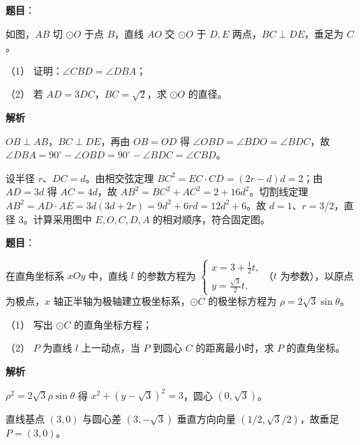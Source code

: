 \begin{answer}

\textbf{题目}：

如图，$AB$ 切 $\odot O$ 于点 $B$，直线 $AO$ 交 $\odot O$ 于 $D,E$ 两点，$BC\perp DE$，垂足为 $C$。

（1） 证明：$\angle CBD=\angle DBA$；

（2） 若 $AD=3DC$，$BC=\sqrt2$，求 $\odot O$ 的直径。
\nopagebreak[4]
\begin{center}\end{center}
\nopagebreak[4]
\textbf{解析}


$OB\perp AB$，$BC\perp DE$，再由 $OB=OD$ 得 $\angle OBD=\angle BDO=\angle BDC$，故 $\angle DBA=90^\circ-\angle OBD=90^\circ-\angle BDC=\angle CBD$。


设半径 $r$、$DC=d$。由相交弦定理 $BC^2=EC\cdot CD=(2r-d)d=2$；由 $AD=3d$ 得 $AC=4d$，故 $AB^2=BC^2+AC^2=2+16d^2$。切割线定理 $AB^2=AD\cdot AE=3d(3d+2r)=9d^2+6rd=12d^2+6$。故 $d=1$、$r=3/2$，直径 3。计算采用图中 $E,O,C,D,A$ 的相对顺序，符合固定图。



\end{answer}
\begin{answer}

\textbf{题目}：

在直角坐标系 $xOy$ 中，直线 $l$ 的参数方程为 $\begin{cases}x=3+\frac12t,\\y=\frac{\sqrt3}{2}t,\end{cases}$（$t$ 为参数），以原点为极点，$x$ 轴正半轴为极轴建立极坐标系，$\odot C$ 的极坐标方程为 $\rho=2\sqrt3\sin\theta$。

（1） 写出 $\odot C$ 的直角坐标方程；

（2） $P$ 为直线 $l$ 上一动点，当 $P$ 到圆心 $C$ 的距离最小时，求 $P$ 的直角坐标。

\textbf{解析}


$\rho^2=2\sqrt3\rho\sin\theta$ 得 $x^2+(y-\sqrt3)^2=3$，圆心 $(0,\sqrt3)$。


直线基点 $(3,0)$ 与圆心差 $(3,-\sqrt3)$ 垂直方向向量 $(1/2,\sqrt3/2)$，故垂足 $P=(3,0)$。



\end{answer}
